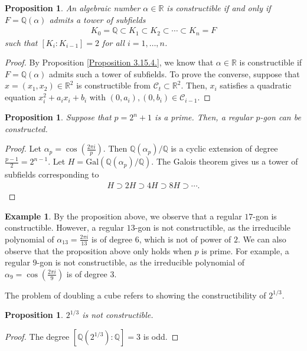 \documentclass[12pt]{report}
\theoremstyle{plain}
\newtheorem{proposition}[theorem]{Proposition}
\theoremstyle{remark}
\theoremstyle{definition}
\newtheorem{example}[theorem]{Example}
\newcommand{\Q}{\mathbb{Q}}
\newcommand{\R}{\mathbb{R}}
\begin{document}
\begin{proposition}
    An algebraic number $\alpha\in\R$ is constructible if and only if $F=\Q(\alpha)$ admits a tower of subfields
    \begin{align*}
        K_0=\Q\subset K_1\subset K_2\subset\cdots\subset K_n=F
    \end{align*}
    such that $[K_i:K_{i-1}]=2$ for all $i=1,\dots,n$.
\end{proposition}
\begin{proof}
    By Proposition \ref{Proposition 3.15.4.}, we know that $\alpha\in \R$ is constructible if $F=\Q(\alpha)$ admits such a tower of subfields. To prove the converse, suppose that $x=(x_1,x_2)\in\R^2$ is constructible from $\mathcal{C}_t\subset \R^2$. Then, $x_i$ satisfies a quadratic equation $x_i^2+a_ix_i+b_i$ with $(0,a_i),(0,b_i)\in\mathcal{C}_{i-1}$.
\end{proof}

\begin{proposition}
    Suppose that $p=2^n+1$ is a prime. Then, a regular $p$-gon can be constructed.
\end{proposition}
\begin{proof}
    Let $\alpha_p=\cos\left(\frac{2\pi i}{p}\right)$. Then $\Q(\alpha_p)/\Q$ is a cyclic extension of degree $\frac{p-1}{2} = 2^{n-1}$. Let $H=\mathrm{Gal}(\Q(\alpha_p)/\Q)$. The Galois theorem gives us a tower of subfields corresponding to
    \begin{align*}
        H\supset 2H\supset 4H\supset 8H\supset\cdots.
    \end{align*}
\end{proof}

\begin{example}
    By the proposition above, we observe that a regular $17$-gon is constructible. However, a regular $13$-gon is not constructible, as the irreducible polynomial of $\alpha_{13} = \frac{2\pi i}{13}$ is of degree $6$, which is not of power of $2$. We can also observe that the proposition above only holds when $p$ is prime. For example, a regular $9$-gon is not constructible, as the irreducible polynomial of $\alpha_9 = \cos\left(\frac{2\pi i}{9}\right)$ is of degree $3$.
\end{example}

The problem of doubling a cube refers to showing the constructibility of $2^{1/3}$.

\begin{proposition}
    $2^{1/3}$ is not constructible.
\end{proposition}
\begin{proof}
    The degree $[\Q(2^{1/3}):\Q]=3$ is odd.
\end{proof}
\end{document}
